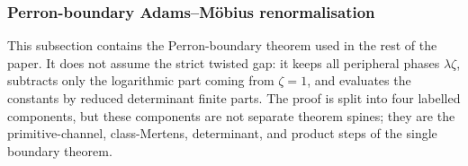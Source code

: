 \subsubsection{Perron-boundary Adams--M\"obius renormalisation}
\label{subsubsec:perron-boundary-adams-mobius-renormalisation}

This subsection contains the Perron-boundary theorem used in the rest of the
paper.  It does not assume the strict twisted gap: it keeps all peripheral
phases \(\lambda\zeta\), subtracts only the logarithmic part coming from
\(\zeta=1\), and evaluates the constants by reduced determinant finite parts.
The proof is split into four labelled components, but these components are
not separate theorem spines; they are the primitive-channel, class-Mertens,
determinant, and product steps of the single boundary theorem.

